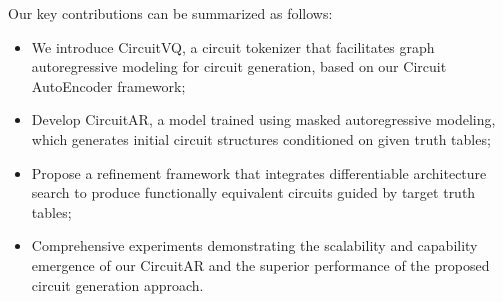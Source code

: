 Our key contributions can be summarized as follows:
\begin{itemize}
\item We introduce CircuitVQ, a circuit tokenizer that facilitates graph autoregressive modeling for circuit generation, based on our Circuit AutoEncoder framework;
\item Develop CircuitAR, a model trained using masked autoregressive modeling, which generates initial circuit structures conditioned on given truth tables;
\item Propose a refinement framework that integrates differentiable architecture search to produce functionally equivalent circuits guided by target truth tables;
\item Comprehensive experiments demonstrating the scalability and capability emergence of our CircuitAR and the superior performance of the proposed circuit generation approach.
\end{itemize}


